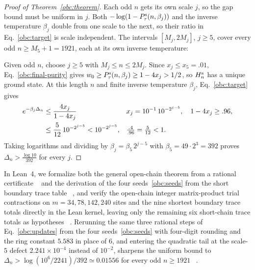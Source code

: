\begin{proof}[Proof of Theorem~\ref{obc:theorem}]
    Each odd $n$ gets its own scale $j$, so the gap bound must be uniform
    in $j$. Both $-\log(1-P_{\tau}^{\mathrm{s}}(n,\beta_j))$ and the inverse temperature
    $\beta_j$ double from one scale to the next, so their ratio in
    Eq.~\eqref{obc:target} is scale independent.
    The intervals $[M_j,2M_j]$, $j\ge5$, cover every odd $n\ge M_5+1=1921$,
    each at its own inverse temperature:
    \begin{proofdiagram}
        \oddcoverage
    \end{proofdiagram}
    Given odd $n$, choose $j\ge5$ with $M_j\le n\le2M_j$.
    Since $x_j\le x_5=.01$, Eq.~\eqref{obc:final-purity} gives
    $w_0\ge P_{\tau}^{\mathrm{s}}(n,\beta_j)\ge1-4x_j>1/2$, so $H_n^{\mathrm{s}}$ has a unique ground state. At this
    length $n$ and finite inverse temperature $\beta_j$,
    Eq.~\eqref{obc:target} gives
    \begin{align}
        e^{-\beta_j\Delta_n}
         &\le\frac{4x_j}{1-4x_j}
         &                               &x_j=10^{-1}\,10^{-2^{j-5}},\quad 1-4x_j\ge.96,\notag\\
         &\le\frac{5}{12}\,10^{-2^{j-5}}
        <10^{-2^{j-5}},
         &                               &\tfrac{.4}{.96}=\tfrac{5}{12}<1.
        \label{obc:gap-final}
    \end{align}
    Taking logarithms and dividing by $\beta_j=\beta_5\,2^{j-5}$ with
    $\beta_5=49\cdot2^3=392$ proves $\Delta_n>\tfrac{\log10}{392}$ for every $j$.
\end{proof}

In Lean~4, we formalize both the general open-chain theorem from a
rational certificate%
~
and the derivation of the four seeds~\eqref{obc:seeds} from the short
boundary trace table%
~,
and verify the open-chain integer matrix-product trial contractions on
$m=34,78,142,240$ sites and the nine shortest boundary trace totals
directly in the Lean kernel, leaving only the remaining six short-chain
trace totals as hypotheses%
~.
Rerunning the same three rational steps of Eq.~\eqref{obc:updates} from
the four seeds~\eqref{obc:seeds} with four-digit rounding and the ring
constant $5.583$ in place of $6$, and entering the quadratic tail at the
scale-$5$ defect $2.241\times10^{-4}$ instead of $10^{-2}$, sharpens the
uniform bound to $\Delta_n>\log(10^6/2241)/392\simeq0.01556$ for every
odd $n\ge1921$%
~.
